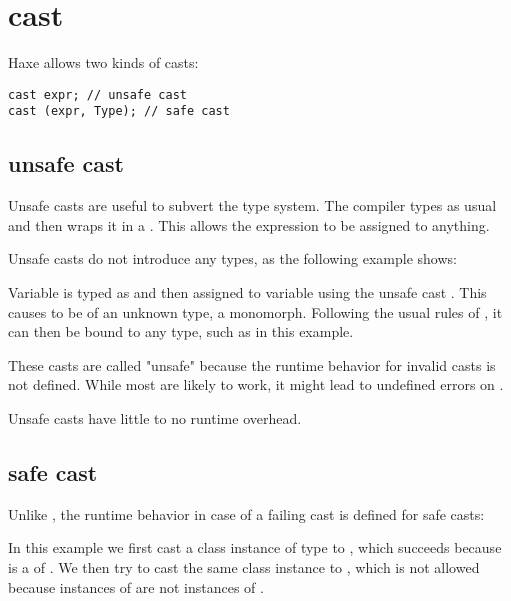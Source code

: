 \section{cast}
\label{expression-cast}

Haxe allows two kinds of casts:

\begin{lstlisting}
cast expr; // unsafe cast
cast (expr, Type); // safe cast
\end{lstlisting}

\subsection{unsafe cast}
\label{expression-cast-unsafe}

Unsafe casts are useful to subvert the type system. The compiler types  as usual and then wraps it in a . This allows the expression to be assigned to anything.

Unsafe casts do not introduce any  types, as the following example shows:


Variable  is typed as  and then assigned to variable  using the unsafe cast . This causes  to be of an unknown type, a monomorph. Following the usual rules of , it can then be bound to any type, such as  in this example.

These casts are called "unsafe" because the runtime behavior for invalid casts is not defined. While most  are likely to work, it might lead to undefined errors on .

Unsafe casts have little to no runtime overhead.

\subsection{safe cast}
\label{expression-cast-safe}

Unlike , the runtime behavior in case of a failing cast is defined for safe casts:


In this example we first cast a class instance of type  to , which succeeds because  is a  of . We then try to cast the same class instance to , which is not allowed because instances of  are not instances of .

